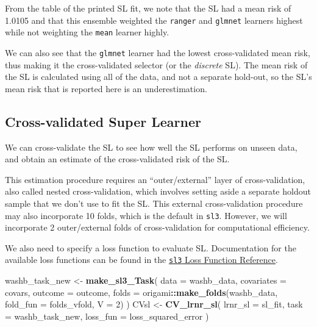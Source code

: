 \documentclass[12pt, krantz2,]{krantz}
\newenvironment{Shaded}{\begin{snugshade}}{\end{snugshade}}
\newcommand{\DataTypeTok}[1]{\textcolor[rgb]{0.27,0.27,0.27}{#1}}
\newcommand{\DecValTok}[1]{\textcolor[rgb]{0.06,0.06,0.06}{#1}}
\newcommand{\KeywordTok}[1]{\textcolor[rgb]{0.27,0.27,0.27}{\textbf{#1}}}
\newcommand{\NormalTok}[1]{#1}
\newcommand{\OperatorTok}[1]{\textcolor[rgb]{0.43,0.43,0.43}{\textbf{#1}}}
\newcommand{\StringTok}[1]{\textcolor[rgb]{0.5,0.5,0.5}{#1}}
\theoremstyle{definition}
\theoremstyle{definition}
\theoremstyle{definition}
\newcommand{\1}{\mathbbm{1}}
\begin{document}
From the table of the printed SL fit, we note that the SL had a mean risk of
1.0105 and that
this ensemble weighted the \texttt{ranger} and \texttt{glmnet} learners highest while not
weighting the \texttt{mean} learner highly.

We can also see that the \texttt{glmnet} learner had the lowest cross-validated mean
risk, thus making it the cross-validated selector (or the \emph{discrete} SL). The
mean risk of the SL is calculated using all of the data, and not a separate
hold-out, so the SL's mean risk that is reported here is an underestimation.

\hypertarget{cross-validated-super-learner}{%
\subsection*{Cross-validated Super Learner}\label{cross-validated-super-learner}}


We can cross-validate the SL to see how well the SL performs on unseen data,
and obtain an estimate of the cross-validated risk of the SL.

This estimation procedure requires an ``outer/external'' layer of
cross-validation, also called nested cross-validation, which involves setting
aside a separate holdout sample that we don't use to fit the SL. This external
cross-validation procedure may also incorporate 10 folds, which is the default
in \texttt{sl3}. However, we will incorporate 2 outer/external folds of
cross-validation for computational efficiency.

We also need to specify a loss function to evaluate SL. Documentation for the
available loss functions can be found in the \href{https://tlverse.org/sl3/reference/loss_functions.html}{\texttt{sl3} Loss
Function Reference}.

\begin{Shaded}
\begin{Highlighting}[]
\NormalTok{washb_task_new <-}\StringTok{ }\KeywordTok{make_sl3_Task}\NormalTok{(}
  \DataTypeTok{data =}\NormalTok{ washb_data,}
  \DataTypeTok{covariates =}\NormalTok{ covars,}
  \DataTypeTok{outcome =}\NormalTok{ outcome,}
  \DataTypeTok{folds =}\NormalTok{ origami}\OperatorTok{::}\KeywordTok{make_folds}\NormalTok{(washb_data, }\DataTypeTok{fold_fun =}\NormalTok{ folds_vfold, }\DataTypeTok{V =} \DecValTok{2}\NormalTok{)}
\NormalTok{)}
\NormalTok{CVsl <-}\StringTok{ }\KeywordTok{CV_lrnr_sl}\NormalTok{(}
  \DataTypeTok{lrnr_sl =}\NormalTok{ sl_fit, }\DataTypeTok{task =}\NormalTok{ washb_task_new, }\DataTypeTok{loss_fun =}\NormalTok{ loss_squared_error}
\NormalTok{)}
\end{Highlighting}
\end{Shaded}
\end{document}

